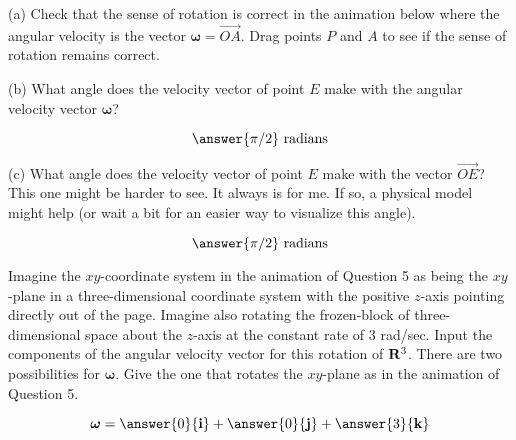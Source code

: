 \documentclass{ximera}
\begin{document}
\begin{exploration}  \label{Ex4gb3e3:Cross}

(a) Check that the sense of rotation is correct in the animation below where the angular velocity is the vector $\boldsymbol{\omega} = \overrightarrow{OA}$. Drag points $P$ and $A$ to see if the sense of rotation remains correct.

(b) What angle does the velocity vector of point $E$ make with the angular velocity vector $\boldsymbol{\omega}$? 
\begin{question} \label{Qdsbhjj}
\[
   \answer{\pi/2} \text{ radians}
\]
\end{question}

(c) What angle does the velocity vector of point $E$ make with the vector ${\overrightarrow{OE}}$? This one might be harder to see. It always is for me. If so, a physical model might help (or wait a bit for an easier way to visualize this angle).

\begin{question} \label{Qddsghhhjj}
\[
   \answer{\pi/2} \text{ radians}
\]
\end{question}


 
\begin{onlineOnly}
    \begin{center}
\end{center}
\end{onlineOnly}

\end{exploration}



Imagine the $xy$-coordinate system in the animation of Question 5  as being the $xy$-plane in a three-dimensional coordinate system with the positive $z$-axis pointing directly out of the page. Imagine also rotating the frozen-block of three-dimensional space about the $z$-axis at the constant rate of $3$ rad/sec. Input the components of the angular velocity vector for this rotation of ${\bf R}^3$. There are two possibilities for $\boldsymbol{\omega}$. Give the one that rotates the $xy$-plane as in the animation of Question 5. 

\begin{question}  \label{Qhfnbyt:Cross}
\[
\boldsymbol{\omega} = \answer{0}{\bf i} + \answer{0}{\bf j} + \answer{3}{\bf k}
\]
\end{question}
\end{document}
